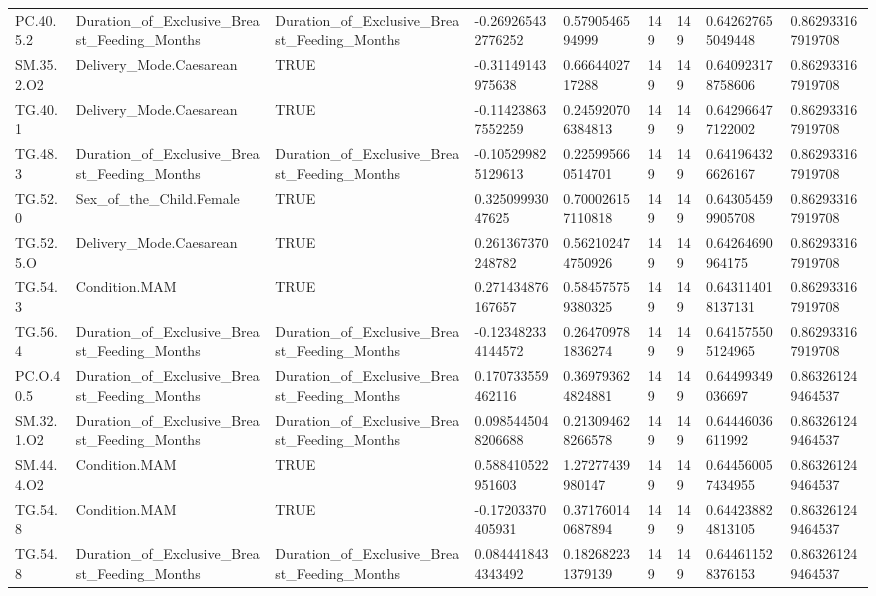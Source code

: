 \begin{longtable}{lllllllll}
PC.40.5.2 & Duration\_of\_Exclusive\_Breast\_Feeding\_Months & Duration\_of\_Exclusive\_Breast\_Feeding\_Months & -0.269265432776252 & 0.5790546594999 & 149 & 149 & 0.642627655049448 & 0.862933167919708 \\
SM.35.2.O2 & Delivery\_Mode.Caesarean & TRUE & -0.31149143975638 & 0.6664402717288 & 149 & 149 & 0.640923178758606 & 0.862933167919708 \\
TG.40.1 & Delivery\_Mode.Caesarean & TRUE & -0.114238637552259 & 0.245920706384813 & 149 & 149 & 0.642966477122002 & 0.862933167919708 \\
TG.48.3 & Duration\_of\_Exclusive\_Breast\_Feeding\_Months & Duration\_of\_Exclusive\_Breast\_Feeding\_Months & -0.105299825129613 & 0.225995660514701 & 149 & 149 & 0.641964326626167 & 0.862933167919708 \\
TG.52.0 & Sex\_of\_the\_Child.Female & TRUE & 0.32509993047625 & 0.700026157110818 & 149 & 149 & 0.643054599905708 & 0.862933167919708 \\
TG.52.5.O & Delivery\_Mode.Caesarean & TRUE & 0.261367370248782 & 0.562102474750926 & 149 & 149 & 0.64264690964175 & 0.862933167919708 \\
TG.54.3 & Condition.MAM & TRUE & 0.271434876167657 & 0.584575759380325 & 149 & 149 & 0.643114018137131 & 0.862933167919708 \\
TG.56.4 & Duration\_of\_Exclusive\_Breast\_Feeding\_Months & Duration\_of\_Exclusive\_Breast\_Feeding\_Months & -0.123482334144572 & 0.264709781836274 & 149 & 149 & 0.641575505124965 & 0.862933167919708 \\
PC.O.40.5 & Duration\_of\_Exclusive\_Breast\_Feeding\_Months & Duration\_of\_Exclusive\_Breast\_Feeding\_Months & 0.170733559462116 & 0.369793624824881 & 149 & 149 & 0.64499349036697 & 0.863261249464537 \\
SM.32.1.O2 & Duration\_of\_Exclusive\_Breast\_Feeding\_Months & Duration\_of\_Exclusive\_Breast\_Feeding\_Months & 0.0985445048206688 & 0.213094628266578 & 149 & 149 & 0.64446036611992 & 0.863261249464537 \\
SM.44.4.O2 & Condition.MAM & TRUE & 0.588410522951603 & 1.27277439980147 & 149 & 149 & 0.644560057434955 & 0.863261249464537 \\
TG.54.8 & Condition.MAM & TRUE & -0.17203370405931 & 0.371760140687894 & 149 & 149 & 0.644238824813105 & 0.863261249464537 \\
TG.54.8 & Duration\_of\_Exclusive\_Breast\_Feeding\_Months & Duration\_of\_Exclusive\_Breast\_Feeding\_Months & 0.0844418434343492 & 0.182682231379139 & 149 & 149 & 0.644611528376153 & 0.863261249464537 \\

\end{longtable}
